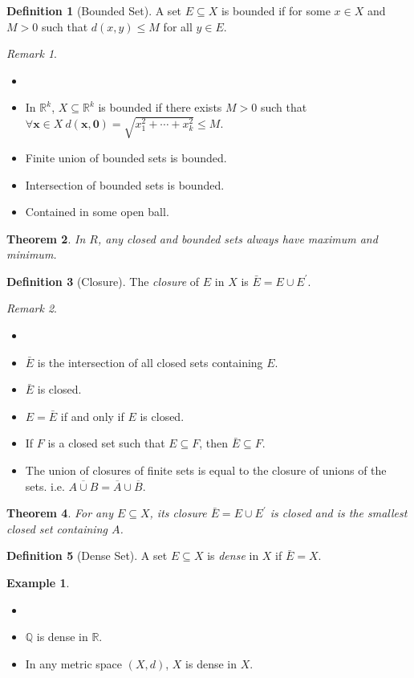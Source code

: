 \documentclass[12pt, lettersize]{book}
\theoremstyle{plain}
\newtheorem{thm}{Theorem}[section]
\theoremstyle{definition}
\newtheorem{dfn}[thm]{Definition}
\newtheorem*{eg}{Example}
\theoremstyle{remark}
\newtheorem*{rem}{Remark}
\newcommand{\R}{\mathbb{R}}
\newcommand{\Q}{\mathbb{Q}}
\begin{document}
	\begin{dfn}[Bounded Set]
		A set $E\subseteq X$ is bounded if for some $x\in X$ and $M>0$ such that $d(x,y)\leq M$ for all $y\in E$.
	\end{dfn}
	\begin{rem}
		\begin{itemize}
			\item[]
			\item In $\R^k$, $X\subseteq\R^k$ is bounded if there exists $M>0$ such that $\forall\mathbf{x}\in X\ d(\mathbf{x},\mathbf{0})=\sqrt{x_1^2+\cdots+x_k^2}\leq M$.
			\item Finite union of bounded sets is bounded.
			\item Intersection of bounded sets is bounded.
			\item Contained in some open ball.
		\end{itemize}
	\end{rem}
	
	\begin{thm}
		In $R$, any closed and bounded sets always have maximum and minimum.
	\end{thm}
	
	\begin{dfn}[Closure]
		The \emph{closure} of $E$ in $X$ is $\bar{E}=E\cup E^\prime$.
	\end{dfn}
	\begin{rem}
		\begin{itemize}
			\item[]
			\item $\bar{E}$ is the intersection of all closed sets containing $E$.
			\item $\bar{E}$ is closed.
			\item $E=\bar{E}$ if and only if $E$ is closed.
			\item If $F$ is a closed set such that $E\subseteq F$, then $\bar{E}\subseteq F$.
			\item The union of closures of finite sets is equal to the closure of unions of the sets. i.e. $\overline{A\cup B}=\overline{A}\cup\overline{B}$.
		\end{itemize}
	\end{rem}
	
	\begin{thm}
		For any $E\subseteq X$, its closure $\bar{E}=E\cup E^\prime$ is closed and is the smallest closed set containing $A$.
	\end{thm}
	
	\begin{dfn}[Dense Set]
		A set $E\subseteq X$ is \emph{dense} in $X$ if $\bar{E}=X$.
	\end{dfn}
	\begin{eg}
		\begin{itemize}
			\item[]
			\item $\Q$ is dense in $\R$.
			\item In any metric space $(X,d)$, $X$ is dense in $X$. 
		\end{itemize}
	\end{eg}
	
\end{document}
